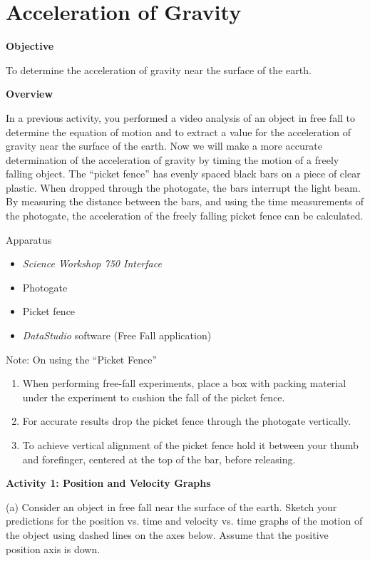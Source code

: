 
\section{Acceleration of Gravity}

\makelabheader %

\textbf{Objective} 

To determine the acceleration of gravity near the surface of the earth.

\textbf{Overview }

In a previous activity, you performed a video analysis of an object in free
fall to determine the equation of motion and to extract a value for the acceleration
of gravity near the surface of the earth. Now we will make a more accurate determination
of the acceleration of gravity by timing the motion of a freely falling object.
The ``picket fence'' has evenly spaced black bars on a piece
of clear plastic. When dropped through the photogate, the bars interrupt the
light beam. By measuring the distance between the bars, and using the time measurements
of the photogate, the acceleration of the freely falling picket fence can be
calculated. 

Apparatus 

\begin{itemize}
\item \textit{Science Workshop 750 Interface}
\item Photogate 
\item Picket fence 
\item \textit{DataStudio} software (Free Fall application)
\end{itemize}
Note: On using the ``Picket Fence''

\begin{enumerate}
\item When performing free-fall experiments, place a box with packing material under
the experiment to cushion the fall of the picket fence.
\item For accurate results drop the picket fence through the photogate vertically.
\item To achieve vertical alignment of the picket fence hold it between your thumb
and forefinger, centered at the top of the bar, before releasing.
\end{enumerate}
\textbf{Activity 1: Position and Velocity Graphs}

(a) Consider an object in free fall near the surface of the earth. Sketch your
predictions for the position vs. time and velocity vs. time graphs of the motion
of the object using dashed lines on the axes below. Assume that the positive
position axis is down.

